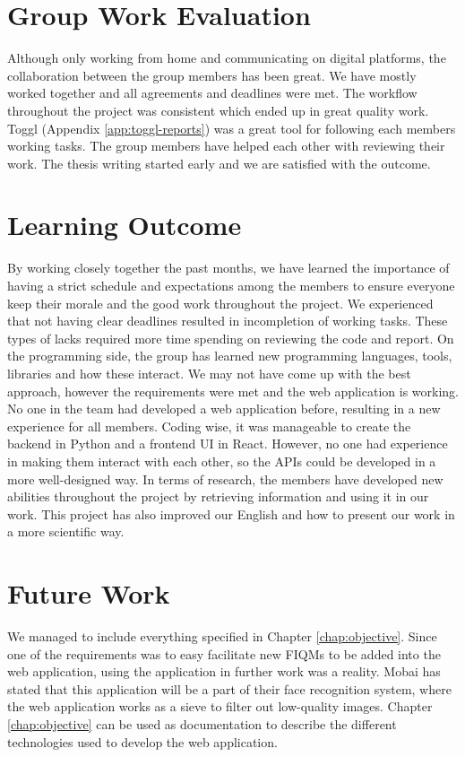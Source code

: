 \section{Group Work Evaluation}
\label{sec:groupworkevaluation}
Although only working from home and communicating on digital platforms, the collaboration between the group members has been great. We have mostly worked together and all agreements and deadlines were met. The workflow throughout the project was consistent which ended up in great quality work. Toggl (Appendix \ref{app:toggl-reports}) was a great tool for following each members working tasks. The group members have helped each other with reviewing their work. The thesis writing started early and we are satisfied with the outcome. 

\section{Learning Outcome}
\label{sec:learningoutcome}
By working closely together the past months, we have learned the importance of having a strict schedule and expectations among the members to ensure everyone keep their morale and the good work throughout the project. We experienced that not having clear deadlines resulted in incompletion of working tasks. These types of lacks required more time spending on reviewing the code and report. On the programming side, the group has learned new programming languages, tools, libraries and how these interact. We may not have come up with the best approach, however the requirements were met and the web application is working. No one in the team had developed a web application before, resulting in a new experience for all members. Coding wise, it was manageable to create the backend in Python and a frontend UI in React. However, no one had experience in making them interact with each other, so the APIs could be developed in a more well-designed way. In terms of research, the members have developed new abilities throughout the project by retrieving information and using it in our work. This project has also improved our English and how to present our work in a more scientific way.  

\section{Future Work}
\label{sec:futurework}
We managed to include everything specified in Chapter \ref{chap:objective}. Since one of the requirements was to easy facilitate new FIQMs to be added into the web application, using the application in further work was a reality. Mobai has stated that this application will be a part of their face recognition system, where the web application works as a sieve to filter out low-quality images. Chapter \ref{chap:objective} can be used as documentation to describe the different technologies used to develop the web application.

